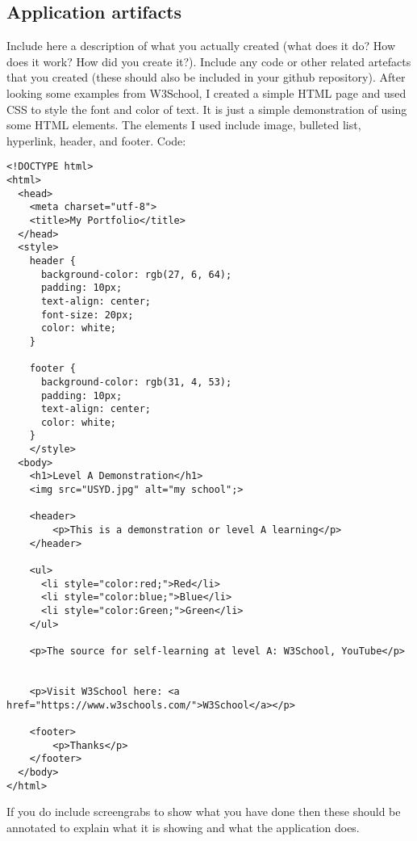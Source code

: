 \documentclass[a4paper, 11pt]{report}
\begin{document}
\subsection{Application artifacts}
Include here a description of what you actually created (what does it do? How does it work? How did you create it?). Include any code or other related artefacts that you created (these should also be included in your github repository).
\newline
\newline
After looking some examples from W3School, I created a simple HTML page and used CSS to style the font and color of text. It is just a simple demonstration of using some HTML elements. The elements I used include image, bulleted list, hyperlink, header, and footer.
\newline
Code:
\newline
\begin{verbatim}
<!DOCTYPE html>
<html>
  <head>
    <meta charset="utf-8">
    <title>My Portfolio</title>
  </head>
  <style>
    header {
      background-color: rgb(27, 6, 64);
      padding: 10px;
      text-align: center;
      font-size: 20px;
      color: white;
    }

    footer {
      background-color: rgb(31, 4, 53);
      padding: 10px;
      text-align: center;
      color: white;
    }
    </style>
  <body>
    <h1>Level A Demonstration</h1>
    <img src="USYD.jpg" alt="my school";>

    <header>
        <p>This is a demonstration or level A learning</p>
    </header>

    <ul>
      <li style="color:red;">Red</li>
      <li style="color:blue;">Blue</li>
      <li style="color:Green;">Green</li>
    </ul>

    <p>The source for self-learning at level A: W3School, YouTube</p>


    <p>Visit W3School here: <a href="https://www.w3schools.com/">W3School</a></p>

    <footer>
        <p>Thanks</p>
    </footer>
  </body>
</html>
\end{verbatim}

\newline

If you do include screengrabs to show what you have done then these should be annotated to explain what it is showing and what the application does.


\end{document}
